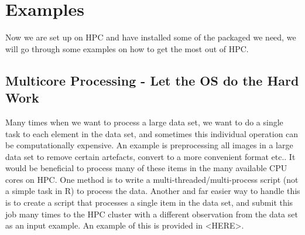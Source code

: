 \section{Examples}
Now we are set up on HPC and have installed some of the packaged we need, we will go through some examples on how to get the most out of HPC.
%
%
%
\subsection{Multicore Processing - Let the OS do the Hard Work}
%
%
Many times when we want to process a large data set, we want to do a single task to each element in the data set, and sometimes this individual operation can be computationally expensive. An example is preprocessing all images in a large data set to remove certain artefacts, convert to a more convenient format etc.. It would be beneficial to process many of these items in the many available CPU cores on HPC. One method is to write a multi-threaded/multi-process script (not a simple task in R) to process the data. Another and far easier way to handle this is to create a script that processes a single item in the data set, and submit this job many times to the HPC cluster with a different observation from the data set as an input example. An example of this is provided in <HERE>.

% 
%
%
%
